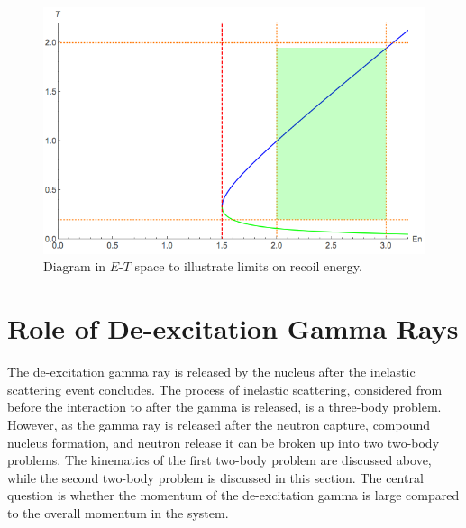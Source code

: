 \documentclass[review]{elsarticle}
\begin{document}
\begin{figure}
	\centering
	\includegraphics[width=1.0\linewidth]{energy_boundaries.png}
	\caption{Diagram in $E$-$T$ space to illustrate limits on recoil energy.}
	\label{fig:energy_boundaries}
\end{figure}

    
\section{Role of De-excitation Gamma Rays}
The de-excitation gamma ray is released by the nucleus after the inelastic scattering event concludes. The process of inelastic scattering, considered from before the interaction to after the gamma is released, is a three-body problem. However, as the gamma ray is released after the neutron capture, compound nucleus formation, and neutron release it can be broken up into two two-body problems. The kinematics of the first two-body problem are discussed above, while the second two-body problem is discussed in this section. The central question is whether the momentum of the de-excitation gamma is large compared to the overall momentum in the system. 
\end{document}
